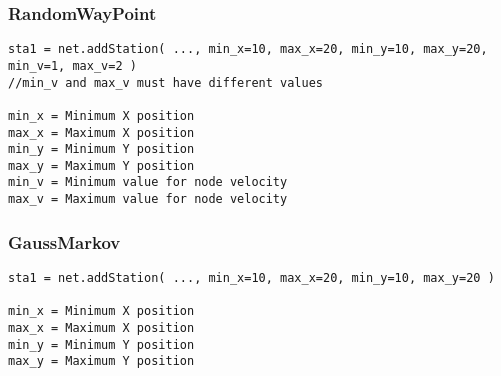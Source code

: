 \subsubsection{RandomWayPoint}

\begin{verbatim}
sta1 = net.addStation( ..., min_x=10, max_x=20, min_y=10, max_y=20, min_v=1, max_v=2 )
//min_v and max_v must have different values

min_x = Minimum X position
max_x = Maximum X position
min_y = Minimum Y position
max_y = Maximum Y position
min_v = Minimum value for node velocity
max_v = Maximum value for node velocity
\end{verbatim}

\subsubsection{GaussMarkov}

\begin{verbatim}
sta1 = net.addStation( ..., min_x=10, max_x=20, min_y=10, max_y=20 )

min_x = Minimum X position
max_x = Maximum X position
min_y = Minimum Y position
max_y = Maximum Y position
\end{verbatim}